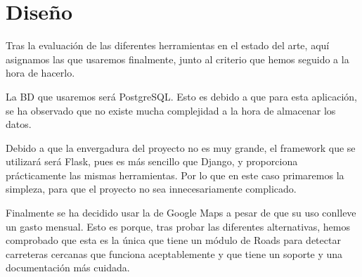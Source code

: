 \section{Diseño\label{SEC:DISENO}}
  Tras la evaluación de las diferentes herramientas en el estado del arte, aquí asignamos las que usaremos finalmente, junto al criterio que hemos seguido a la hora de hacerlo.
  
  La BD que usaremos será PostgreSQL. Esto es debido a que para esta aplicación, se ha observado que no existe mucha complejidad a la hora de almacenar los datos.
  
  Debido a que la envergadura del proyecto no es muy grande, el framework que se utilizará será Flask, pues es más sencillo que Django, y proporciona prácticamente las mismas herramientas. Por lo que en este caso primaremos la simpleza, para que el proyecto no sea innecesariamente complicado.
  
  Finalmente se ha decidido usar la  de Google Maps\cite{gmaps} a pesar de que su uso conlleve un gasto mensual. Esto es porque, tras probar las diferentes alternativas, hemos comprobado que esta  es la única que tiene un módulo de Roads para detectar carreteras cercanas que funciona aceptablemente y que tiene un soporte y una documentación más cuidada.
